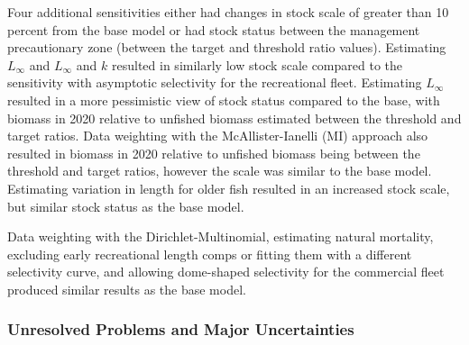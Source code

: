 \documentclass[11pt,
  english,
  a4paper,
]{article}
\begin{document}
\leavevmode\tagmcend\tagstructend\par


Four additional sensitivities either had changes in stock scale of greater than 10 percent from the base model or had stock status between the management precautionary zone (between the target and threshold ratio values). Estimating {\(L_{\infty}\)\leavevmode\tagmcend\tagstructend} and {\(L_{\infty}\)\leavevmode\tagmcend\tagstructend} and {\(k\)\leavevmode\tagmcend\tagstructend} resulted in similarly low stock scale compared to the sensitivity with asymptotic selectivity for the recreational fleet. Estimating {\(L_{\infty}\)\leavevmode\tagmcend\tagstructend} resulted in a more pessimistic view of stock status compared to the base, with biomass in 2020 relative to unfished biomass estimated between the threshold and target ratios. Data weighting with the McAllister-Ianelli (MI) approach also resulted in biomass in 2020 relative to unfished biomass being between the threshold and target ratios, however the scale was similar to the base model. Estimating variation in length for older fish resulted in an increased stock scale, but similar stock status as the base model.

\leavevmode\tagmcend\tagstructend\par


Data weighting with the Dirichlet-Multinomial, estimating natural mortality, excluding early recreational length comps or fitting them with a different selectivity curve, and allowing dome-shaped selectivity for the commercial fleet produced similar results as the base model.

\leavevmode\tagmcend\tagstructend\par


\hypertarget{unresolved-problems-and-major-uncertainties}{%
\subsubsection{Unresolved Problems and Major Uncertainties}\label{unresolved-problems-and-major-uncertainties}}
\end{document}
